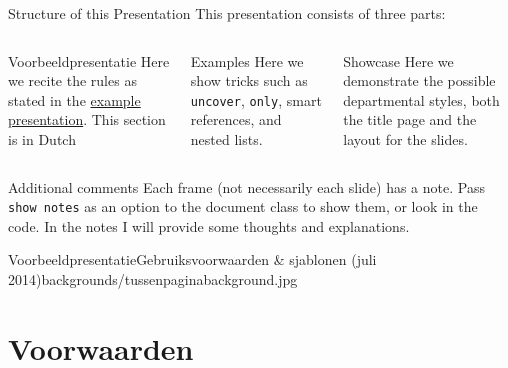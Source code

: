 \documentclass[department=softwarescience, notes={show notes}, slidesperpage=4, handout, official=true]{beamerruhuisstijl}
\begin{document}
\begin{frame}{Structure of this Presentation}
	This presentation consists of three parts:
    \begin{columns}[T,totalwidth=\linewidth]
        \begin{column}{0.3\textwidth}
            \begin{block}{Voorbeeldpresentatie}
            	Here we recite the rules as stated in the \href{http://www.ru.nl/publish/pages/596464/ru_powerpoint_algemeen_2014_toelichting.ppt}{example presentation}. This section is in Dutch
            \end{block}
        \end{column}
        \begin{column}{0.3\textwidth}
            \begin{block}{Examples}
            	Here we show tricks such as \texttt{uncover}, \texttt{only}, smart references, and nested lists.
            \end{block}
        \end{column}
        \begin{column}{0.3\textwidth}
            \begin{block}{Showcase}
            	Here we demonstrate the possible departmental styles, both the title page and the layout for the slides.
            \end{block}
        \end{column}
    \end{columns}
    
    \begin{block}{Additional comments}
      Each frame (not necessarily each slide) has a note. Pass \texttt{show notes} as an option to the document class to show them, or look in the code. In the notes I will provide some thoughts and explanations.
	\end{block}
\end{frame}
\note{
	
}


\renewcommand{\dept}{none}

\begin{tussenpagina}{Voorbeeldpresentatie}{Gebruiksvoorwaarden \& sjablonen (juli 2014)}{backgrounds/tussenpaginabackground.jpg}
\end{tussenpagina}
\note{}

\section{Voorwaarden}
\end{document}
